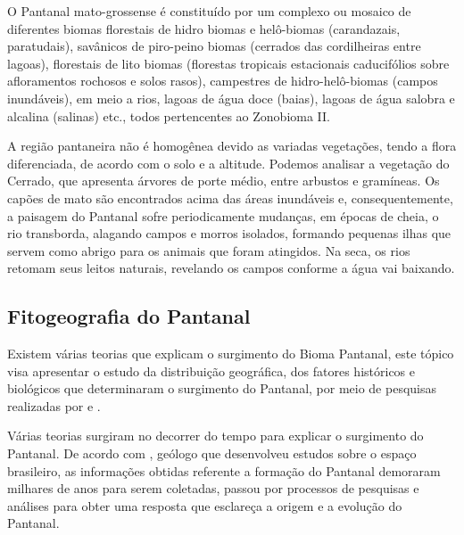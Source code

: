 \begin{citacao}
	O Pantanal mato-grossense é constituído por um complexo ou mosaico de diferentes biomas florestais de hidro biomas e helô-biomas (carandazais, paratudais), savânicos de piro-peino biomas (cerrados das cordilheiras entre lagoas), florestais de lito biomas (florestas tropicais estacionais caducifólios sobre afloramentos rochosos e solos rasos), campestres de hidro-helô-biomas (campos inundáveis), em meio a rios, lagoas de água doce (baias), lagoas de água salobra e alcalina (salinas) etc., todos pertencentes ao Zonobioma II. \cite{coutinho2006conceito}
\end{citacao}


A região pantaneira não é homogênea devido as variadas vegetações, tendo a flora diferenciada, de acordo com o solo e a altitude. Podemos analisar  a vegetação do Cerrado, que apresenta árvores de porte médio, entre arbustos e gramíneas. Os capões de mato são encontrados acima das áreas inundáveis e, consequentemente, a paisagem do Pantanal sofre periodicamente mudanças, em épocas de cheia, o rio transborda, alagando campos e morros isolados, formando pequenas ilhas que servem como abrigo para os animais que foram atingidos. Na seca, os rios retomam seus leitos naturais,  revelando os campos conforme a água vai baixando. \cite{eco}

\subsection{Fitogeografia do Pantanal} 

Existem várias teorias que explicam o surgimento do Bioma Pantanal,  este tópico visa apresentar o estudo da distribuição geográfica, dos fatores históricos e biológicos que determinaram o surgimento do Pantanal, por meio de pesquisas realizadas por  e .

Várias teorias surgiram no decorrer do tempo para explicar o surgimento do Pantanal. De acordo com , geólogo que desenvolveu estudos sobre o espaço brasileiro, as informações obtidas referente a formação do Pantanal demoraram milhares de anos para serem coletadas, passou por processos de pesquisas e análises para obter  uma resposta que esclareça a origem e a evolução do Pantanal.

